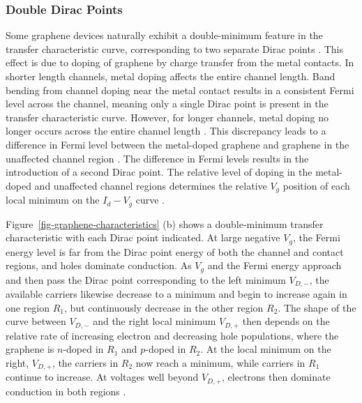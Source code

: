 \documentclass[
  a4paper,
]{scrbook}
\begin{document}
\hypertarget{double-dirac-points}{%
\subsubsection*{Double Dirac Points}\label{double-dirac-points}}

Some graphene devices naturally exhibit a double-minimum feature in the
transfer characteristic curve, corresponding to two separate Dirac
points \autocite{Bartolomeo2011,Feng2014,Zhang2015,Kireev2017,Peng2018}.
This effect is due to doping of graphene by charge transfer from the
metal contacts. In shorter length channels, metal doping affects the
entire channel length. Band bending from channel doping near the metal
contact results in a consistent Fermi level across the channel, meaning
only a single Dirac point is present in the transfer characteristic
curve. However, for longer channels, metal doping no longer occurs
across the entire channel length \autocite{Bartolomeo2011,Peng2018}.
This discrepancy leads to a difference in Fermi level between the
metal-doped graphene and graphene in the unaffected channel region
\autocite{Bartolomeo2011,Feng2014,Peng2018,Zhang2015}. The difference in
Fermi levels results in the introduction of a second Dirac point. The
relative level of doping in the metal-doped and unaffected channel
regions determines the relative \(V_g\) position of each local minimum
on the \(I_d - V_g\) curve \autocite{Bartolomeo2011,Peng2018,Zhang2015}.

Figure~\ref{fig-graphene-characteristics} (b) shows a double-minimum
transfer characteristic with each Dirac point indicated. At large
negative \(V_g\), the Fermi energy level is far from the Dirac point
energy of both the channel and contact regions, and holes dominate
conduction. As \(V_g\) and the Fermi energy approach and then pass the
Dirac point corresponding to the left minimum \(V_{D,-}\), the available
carriers likewise decrease to a minimum and begin to increase again in
one region \(R_1\), but continuously decrease in the other region
\(R_2\). The shape of the curve between \(V_{D,-}\) and the right local
minimum \(V_{D,+}\) then depends on the relative rate of increasing
electron and decreasing hole populations, where the graphene is
\(n\)-doped in \(R_1\) and \(p\)-doped in \(R_2\). At the local minimum
on the right, \(V_{D,+}\), the carriers in \(R_2\) now reach a minimum,
while carriers in \(R_1\) continue to increase. At voltages well beyond
\(V_{D,+}\), electrons then dominate conduction in both regions
\autocite{Bartolomeo2011,Zhang2015,Peng2018}.
\end{document}
